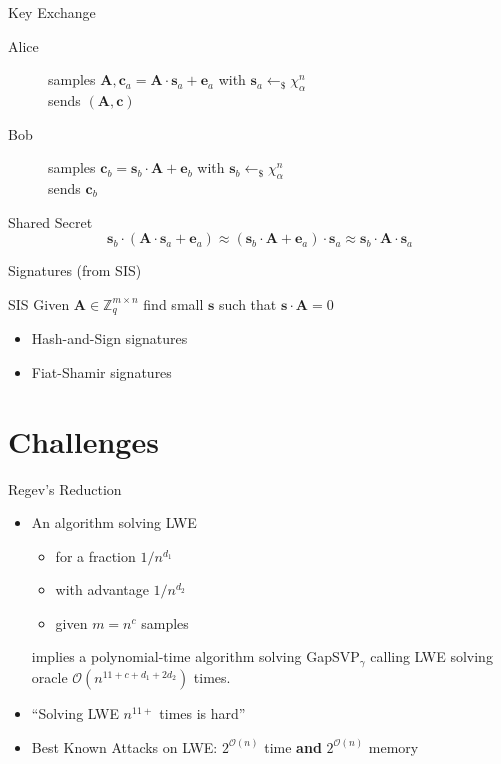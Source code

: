 \documentclass[presentation,smaller]{beamer}
\renewcommand{\vec}[1]{\ensuremath{\mathbf{#1}}\xspace}
\newcommand{\sample}{\ensuremath{\leftarrow_{\$}}}
\begin{document}
\begin{frame}[label={sec:orgheadline17}]{Key Exchange }
\begin{description}
\item[{Alice}] samples \(\vec{A},\vec{c}_a=\vec{A}\cdot \vec{s}_a + \vec{e}_a\) with \(\vec{s}_a \sample χ_α^n\)  \\
sends \((\vec{A},\vec{c})\)
\item[{Bob}] samples \(\vec{c}_b=\vec{s}_b \cdot \vec{A} + \vec{e}_b\) with \(\vec{s}_b \sample χ_α^n\) \\
sends \(\vec{c}_b\)
\end{description}

\begin{block}{Shared Secret}
\[\vec{s}_b \cdot (\vec{A} \cdot \vec{s}_a + \vec{e}_a) \approx (\vec{s}_b \cdot \vec{A} + \vec{e}_a) \cdot \vec{s}_a \approx \vec{s}_b \cdot \vec{A} \cdot \vec{s}_a\]
\end{block}
\end{frame}

\begin{frame}[label={sec:orgheadline18}]{Signatures (from SIS)}
\begin{block}{SIS}
Given \(\vec{A} \in \mathbb{Z}_q^{m \times n}\) find \alert{small} \(\vec{s}\) such that \(\vec{s}⋅\vec{A} = 0\) 
\end{block}

\begin{itemize}
\item Hash-and-Sign signatures 

\item Fiat-Shamir signatures 
\end{itemize}
\end{frame}



\section{Challenges}
\label{sec:orgheadline30}

\begin{frame}[label={sec:orgheadline20}]{Regev’s Reduction}
\begin{itemize}
\item<1-> An algorithm solving LWE 
\begin{itemize}
\item for a fraction \(1/n^{d_1}\)
\item with advantage \(1/n^{d_2}\)
\item given \(m = n^c\) samples
\end{itemize}
implies a polynomial-time algorithm solving GapSVP\(_γ\) calling LWE solving oracle \(\mathcal{O}(n^{11+c+d_1+2d_2})\) times.

\item<2-> “Solving LWE \(n^{11+}\) times is hard”

\item<3-> Best Known Attacks on LWE: \(2^{\mathcal{O}(n)}\) time \textbf{and} \(2^{\mathcal{O}(n)}\) memory
\end{itemize}
\end{frame}
\end{document}

